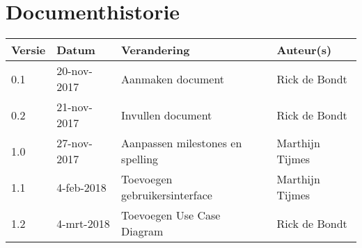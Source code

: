 \section{Documenthistorie}

\begin{tabularx}{\textwidth}{| l | l | X | l |}
    \hline
    \textbf{Versie} & \textbf{Datum} & \textbf{Verandering} & \textbf{Auteur(s)} \\ \hline
    0.1 & 20-nov-2017 & Aanmaken document & Rick de Bondt \\ \hline
    0.2 & 21-nov-2017 & Invullen document & Rick de Bondt \\ \hline
    1.0 & 27-nov-2017 & Aanpassen milestones en spelling & Marthijn Tijmes \\ \hline
    1.1 & 4-feb-2018 & Toevoegen gebruikersinterface & Marthijn Tijmes \\ \hline
    1.2 & 4-mrt-2018 & Toevoegen Use Case Diagram & Rick de Bondt \\ \hline
\end{tabularx}
